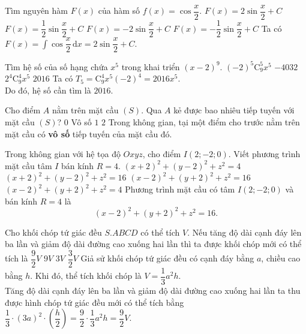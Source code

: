 \begin{ex}%
	Tìm nguyên hàm $F(x)$ của hàm số $f(x)=\cos \dfrac{x}{2}$.
	\choice
	{\True $F(x)=2\sin \dfrac{x}{2} + C$}
	{$F(x)=\dfrac{1}{2}\sin \dfrac{x}{2} + C$}
	{$F(x)=-2\sin \dfrac{x}{2} + C$}
	{$F(x)=-\dfrac{1}{2}\sin \dfrac{x}{2} + C$}
	\loigiai
	{
		Ta có $F(x)=\displaystyle \int \cos \dfrac{x}{2} \mathrm{\,d}x=2\sin\dfrac{x}{2}+C$.
	}
\end{ex}
\begin{ex}%
	Tìm hệ số của số hạng chứa $x^5$ trong khai triển $(x-2)^9$.
	\choice
	{$(-2)^5\mathrm{C}_9^5 x^5$}
	{$-4032$}
	{$2^4\mathrm{C}_9^4 x^5$}
	{\True $2016$}
	\loigiai
	{
		Ta có $T_5=\mathrm{C}_9^4 x^5(-2)^4=2016 x^5$. \\
		Do đó, hệ số cần tìm là $2016$.
	}
\end{ex}
\begin{ex}%
	Cho điểm $A$ nằm trên mặt cầu $(S)$. Qua $A$ kẻ được bao nhiêu tiếp tuyến với mặt cầu $(S)$?
	\choice
	{$0$}
	{\True Vô số}
	{$1$}
	{$2$}
	\loigiai
	{
		Trong không gian, tại một điểm cho trước nằm trên mặt cầu có \textbf{vô số} tiếp tuyến của mặt cầu đó.
	}
\end{ex}
\begin{ex}%
	Trong không gian với hệ tọa độ $Oxyz$, cho điểm $I(2;-2;0)$. Viết phương trình mặt cầu tâm $I$ bán kính $R=4$.
	\choice
	{$(x+2)^2+(y-2)^2+z^2=4$}
	{$(x+2)^2+(y-2)^2+z^2=16$}
	{\True $(x-2)^2+(y+2)^2+z^2=16$}
	{$(x-2)^2+(y+2)^2+z^2=4$}
	\loigiai
	{
		Phương trình mặt cầu có tâm $I(2;-2;0)$ và bán kính $R=4$ là $$(x-2)^2+(y+2)^2+z^2=16.$$
	}
\end{ex}
\begin{ex}%
	Cho khối chóp tứ giác đều $S.ABCD$ có thể tích $V$. Nếu tăng độ dài cạnh đáy lên ba lần và giảm độ dài đường cao xuống hai lần thì ta được khối chóp mới có thể tích là
	\choice
	{\True $\dfrac{9}{2}V$}
	{$9V$}
	{$3V$}
	{$\dfrac{3}{2}V$}
	\loigiai
	{
		Giả sử khối chóp tứ giác đều có cạnh đáy bằng $a$, chiều cao bằng $h$. Khi đó, thể tích khối chóp là $V=\dfrac{1}{3}a^2h$.\\
		Tăng độ dài cạnh đáy lên ba lần và giảm độ dài đường cao xuống hai lần ta thu được hình chóp tứ giác đều mới có thể tích bằng $\dfrac{1}{3} \cdot \left(3a\right)^2 \cdot \left(\dfrac{h}{2}\right)=\dfrac{9}{2}\cdot \dfrac{1}{3}a^2h=\dfrac{9}{2}V$.
	}
\end{ex}
